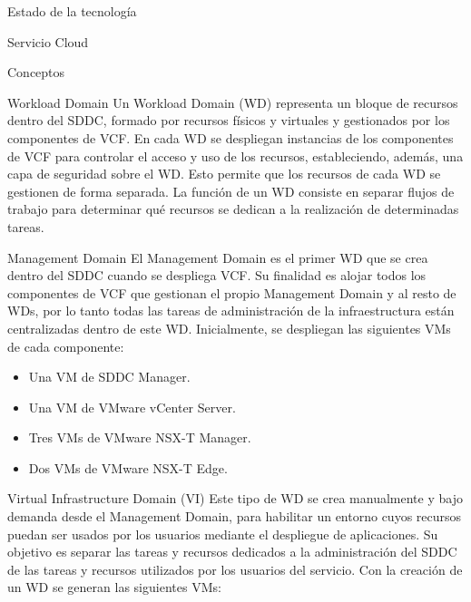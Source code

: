 \begin{chapter}{Estado de la tecnología}
\begin{section}{Servicio Cloud}
\begin{subsection}{Conceptos}
        
        \begin{subsubsection}{Workload Domain}
        Un Workload Domain (WD) representa un bloque de recursos dentro del SDDC, formado por recursos físicos y virtuales y gestionados por los componentes de VCF. En cada WD se despliegan instancias de los componentes de VCF para controlar el acceso y uso de los recursos, estableciendo, además, una capa de seguridad sobre el WD. Esto permite que los recursos de cada WD se gestionen de forma separada. La función de un WD consiste en separar flujos de trabajo para determinar qué recursos se dedican a la realización de determinadas tareas.
        \end{subsubsection}
        \begin{subsubsection}{Management Domain}
        \label{subsubsec:domainManagement}
        El Management Domain es el primer WD que se crea dentro del SDDC cuando se despliega VCF. Su finalidad es alojar todos los componentes de VCF que gestionan el propio Management Domain y al resto de WDs, por lo tanto todas las tareas de administración de la infraestructura están centralizadas dentro de este WD. Inicialmente, se despliegan las siguientes VMs de cada componente:
        \begin{itemize}
          \item Una VM de SDDC Manager.
          \item Una VM de VMware vCenter Server.
          \item Tres VMs de VMware NSX-T Manager.
          \item Dos VMs de VMware NSX-T Edge.
        \end{itemize}
        \end{subsubsection}        
        \begin{subsubsection}{Virtual Infrastructure Domain (VI)}
        \label{subsubsec:domainVI}
        Este tipo de WD se crea manualmente y bajo demanda desde el Management Domain, para habilitar un entorno cuyos recursos puedan ser usados por los usuarios mediante el despliegue de aplicaciones. Su objetivo es separar las tareas y recursos dedicados a la administración del SDDC de las tareas y recursos utilizados por los usuarios del servicio. Con la creación de un WD se generan las siguientes VMs:

\end{subsubsection}
\end{subsection}
\end{section}
\end{chapter}
